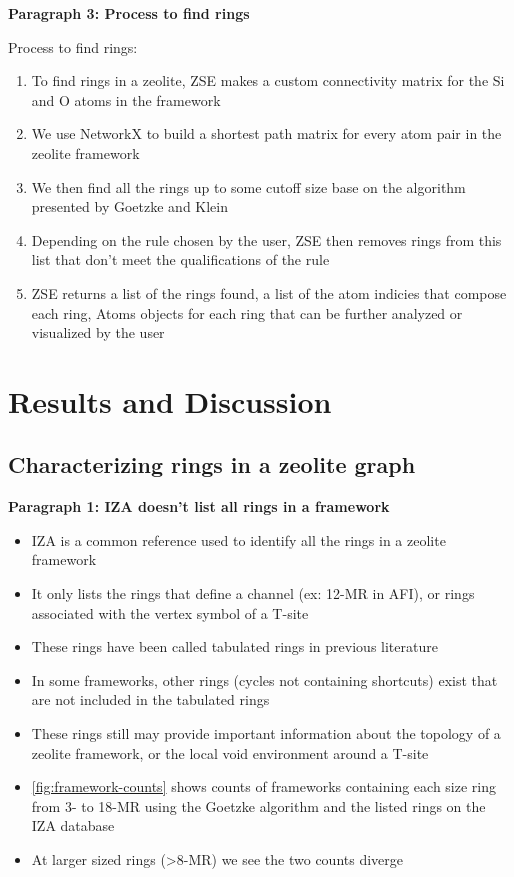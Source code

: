 \documentclass[11pt]{article}
\begin{document}
\textbf{\textbf{Paragraph 3: Process to find rings}}

Process to find rings:
\begin{enumerate}
\item To find rings in a zeolite, ZSE makes a custom connectivity matrix for the Si and O atoms in the framework
\item We use NetworkX \cite{hagberg-exploring-2008} to build a shortest path matrix for every atom pair in the zeolite framework
\item We then find all the rings up to some cutoff size base on the algorithm presented by Goetzke and Klein \cite{goetzke-properties-1991}
\item Depending on the rule chosen by the user, ZSE then removes rings from this list that don't meet the qualifications of the rule
\item ZSE returns a list of the rings found, a list of the atom indicies that compose each ring, Atoms objects for each ring that can be further analyzed or visualized by the user
\end{enumerate}


\section{Results and Discussion}
\label{sec:orgf17e1d7}
\subsection{Characterizing rings in a zeolite graph}
\label{sec:orga4651b7}
\textbf{\textbf{Paragraph 1: IZA doesn't list all rings in a framework}}
\begin{itemize}
\item IZA is a common reference used to identify all the rings in a zeolite framework
\item It only lists the rings that define a channel (ex: 12-MR in AFI), or rings associated with the vertex symbol of a T-site
\item These rings have been called tabulated rings in previous literature \cite{curtis-statistical-2003}
\item In some frameworks, other rings (cycles not containing shortcuts) exist that are not included in the tabulated rings
\item These rings still may provide important information about the topology of a zeolite framework, or the local void environment around a T-site
\item \cref{fig:framework-counts} shows counts of frameworks containing each size ring from 3- to 18-MR using the Goetzke algorithm and the listed rings on the IZA database
\item At larger sized rings (>8-MR) we see the two counts diverge
\end{itemize}
\end{document}
